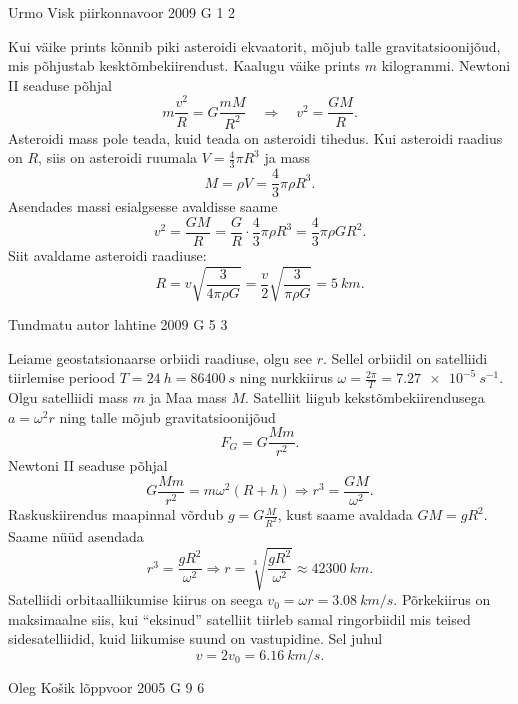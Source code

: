 \documentclass[11pt]{article}
\begin{document}
{%
{Urmo Visk} %
{piirkonnavoor} %
{2009} %
{G 1} %
{2} %
{

\ifSolution
Kui väike prints kõnnib piki asteroidi ekvaatorit, mõjub talle gravitatsioonijõud,
mis põhjustab kesktõmbekiirendust. Kaalugu väike prints $m$ kilogrammi. Newtoni
II seaduse põhjal
\[
m \frac{v^{2}}{R}=G \frac{m M}{R^{2}} \quad \Rightarrow \quad v^{2}=\frac{G M}{R}.
\]
Asteroidi mass pole teada, kuid teada on asteroidi tihedus. Kui asteroidi raadius on $R$, siis on asteroidi ruumala $V=\frac{4}{3} \pi R^{3}$ ja mass
\[
M=\rho V=\frac{4}{3} \pi \rho R^{3}.
\]
Asendades massi esialgsesse avaldisse saame
\[
v^{2}=\frac{G M}{R}=\frac{G}{R} \cdot \frac{4}{3} \pi \rho R^{3}=\frac{4}{3} \pi \rho G R^{2}.
\]
Siit avaldame asteroidi raadiuse:
\[
R=v \sqrt{\frac{3}{4 \pi \rho G}}=\frac{v}{2} \sqrt{\frac{3}{\pi \rho G}}=\SI{5}{km}.
\]
\fi
}

{Tundmatu autor} %
{lahtine} %
{2009} %
{G 5} %
{3} %
{

\ifSolution
Leiame geostatsionaarse orbiidi raadiuse, olgu see $r$. Sellel orbiidil on satelliidi tiirlemise periood $T = \SI{24}{h} = \SI{86400}{s}$ ning nurkkiirus $\omega=\frac{2 \pi}{T}=\SI{7,27e-5}{s^{-1}}$. Olgu satelliidi mass $m$ ja Maa mass $M$. Satelliit liigub kekstõmbekiirendusega $a = \omega^2 r$ ning talle mõjub gravitatsioonijõud
\[
F_{G}=G \frac{M m}{r^{2}}.
\]
Newtoni II seaduse põhjal
\[
G \frac{M m}{r^{2}}=m \omega^{2}(R+h) \Rightarrow r^{3}=\frac{G M}{\omega^{2}}.
\]
Raskuskiirendus maapinnal võrdub $g=G \frac{M}{R^{2}}$, kust saame avaldada $GM = gR^2$.
Saame nüüd asendada 
\[
r^{3}=\frac{g R^{2}}{\omega^{2}} \Rightarrow r=\sqrt[3]{\frac{g R^{2}}{\omega^{2}}} \approx \SI{42300}{km}.
\]
Satelliidi orbitaalliikumise kiirus on seega $v_0 = \omega r = \SI{3,08}{km/s}$. Põrkekiirus on maksimaalne siis, kui \enquote{eksinud} satelliit tiirleb samal ringorbiidil mis teised sidesatelliidid, kuid liikumise suund on vastupidine. Sel juhul
\[
v=2 v_{0}=\SI{6,16}{km/s}.
\]
\fi
}

{Oleg Košik} %
{lõppvoor} %
{2005} %
{G 9} %
{6} %
{

}}
\end{document}
